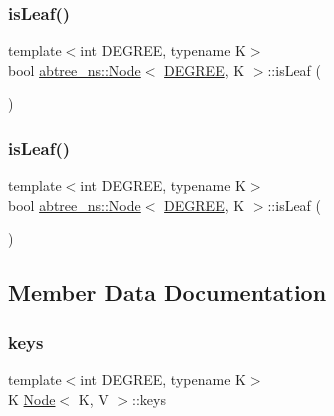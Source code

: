 \subsubsection{\texorpdfstring{is\+Leaf()}{isLeaf()}\hspace{0.1cm}{\footnotesize\ttfamily [1/2]}}
{\footnotesize\ttfamily template$<$int D\+E\+G\+R\+EE, typename K$>$ \\
bool \hyperlink{structabtree__ns_1_1Node}{abtree\+\_\+ns\+::\+Node}$<$ \hyperlink{brown__sigouin__abtree__kcas_2adapter_8h_a5d88b17d70c985f2f2b8e987037fd6dd}{D\+E\+G\+R\+EE}, K $>$\+::is\+Leaf (\begin{DoxyParamCaption}{ }\end{DoxyParamCaption})\hspace{0.3cm}{\ttfamily [inline]}}

\mbox{\label{structabtree__ns_1_1Node_a09fe5b27e3c537ae628c695e9216b450}} 
\subsubsection{\texorpdfstring{is\+Leaf()}{isLeaf()}\hspace{0.1cm}{\footnotesize\ttfamily [2/2]}}
{\footnotesize\ttfamily template$<$int D\+E\+G\+R\+EE, typename K$>$ \\
bool \hyperlink{structabtree__ns_1_1Node}{abtree\+\_\+ns\+::\+Node}$<$ \hyperlink{brown__sigouin__abtree__kcas_2adapter_8h_a5d88b17d70c985f2f2b8e987037fd6dd}{D\+E\+G\+R\+EE}, K $>$\+::is\+Leaf (\begin{DoxyParamCaption}{ }\end{DoxyParamCaption})\hspace{0.3cm}{\ttfamily [inline]}}



\subsection{Member Data Documentation}
\mbox{\label{structabtree__ns_1_1Node_a8d975a4678747a2d60e5bf9ca298a29a}} 
\subsubsection{\texorpdfstring{keys}{keys}}
{\footnotesize\ttfamily template$<$int D\+E\+G\+R\+EE, typename K$>$ \\
K \hyperlink{structabtree__ns_1_1Node}{Node}$<$ K, V $>$\+::keys}

